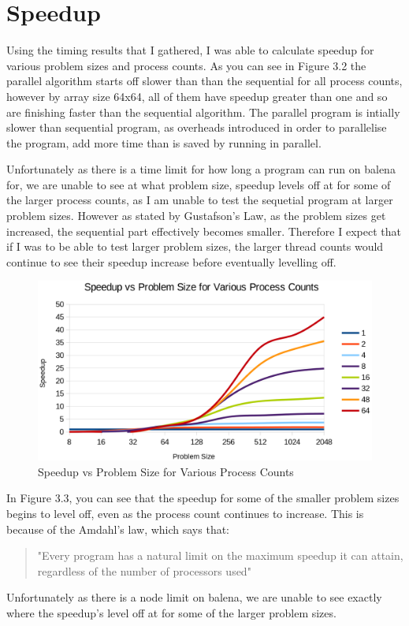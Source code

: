 \documentclass{report}
\begin{document}
\section{Speedup}
Using the timing results that I gathered, I was able to calculate speedup for various problem sizes and process counts. As you can see in Figure 3.2 the parallel algorithm starts off slower than than the sequential for all process counts, however by array size 64x64, all of them have speedup greater than one and so are finishing faster than the sequential algorithm. The parallel program is intially slower than sequential program, as overheads introduced in order to parallelise the program, add more time than is saved by running in parallel.\newline

Unfortunately as there is a time limit for how long a program can run on balena for, we are unable to see at what problem size, speedup levels off at for some of the larger process counts, as I am unable to test the sequetial program at larger problem sizes. However as stated by Gustafson's Law, as the problem sizes get increased, the sequential part effectively becomes smaller. Therefore I expect that if I was to be able to test larger problem sizes, the larger thread counts would continue to see their speedup increase before eventually levelling off.\newline\newline

\begin{figure}[h]
\includegraphics[width=1\textwidth]{Speedup2}
\caption{Speedup vs Problem Size for Various Process Counts}
\label{fig:subim3}
\end{figure}

In Figure 3.3, you can see that the speedup for some of the smaller problem sizes begins to level off, even as the process count continues to increase. This is because of the Amdahl's law, which says that:
\begin{quote}
"Every program has a natural limit on the maximum speedup it can attain, regardless of the number of processors used"
\end{quote}
Unfortunately as there is a node limit on balena, we are unable to see exactly where the speedup's level off at for some of the larger problem sizes. \newline
\end{document}
